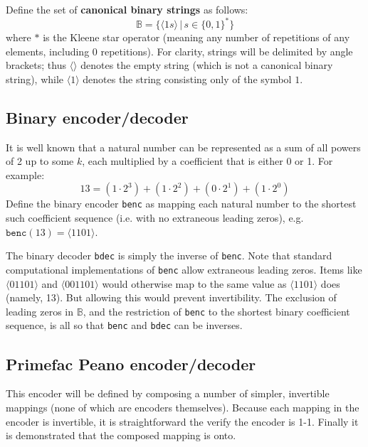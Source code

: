 \documentclass[12pt,reqno]{article}
\begin{document}
Define the set of \textbf{canonical binary strings} as follows:
\begin{equation}
  \mathbb{B} = \{ \langle 1s \rangle \, | \, s \in \{0,1\}^{*} \}
\end{equation}
where $*$ is the Kleene star operator (meaning any number of repetitions of any elements, including 0 repetitions). For clarity, strings will be delimited by angle brackets; thus $\langle \rangle$ denotes the empty string (which is not a canonical binary string), while $\langle 1 \rangle$ denotes the string consisting only of the symbol $1$.

\subsection{Binary encoder/decoder}

It is well known that a natural number can be represented as a sum of all powers of 2 up to some $k$, each multiplied by a coefficient that is either 0 or 1. For example:
\begin{equation}
  13 = (1 \cdot 2^3) + (1 \cdot 2^2) + (0 \cdot 2^1) + (1 \cdot 2^0)
\end{equation}
Define the binary encoder \texttt{benc} as mapping each natural number to the shortest such coefficient sequence (i.e. with no extraneous leading zeros), e.g. $\texttt{benc}(13) = \langle 1101 \rangle$.

The binary decoder \texttt{bdec} is simply the inverse of \texttt{benc}. Note that standard computational implementations of \texttt{benc} allow extraneous leading zeros. Items like $\langle 01101 \rangle$ and $\langle 001101 \rangle$ would otherwise map to the same value as $\langle 1101 \rangle$ does (namely, 13). But allowing this would prevent invertibility. The exclusion of leading zeros in $\mathbb{B}$, and the restriction of \texttt{benc} to the shortest binary coefficient sequence, is all so that \texttt{benc} and \texttt{bdec} can be inverses.

\subsection{Primefac Peano encoder/decoder}

This encoder will be defined by composing a number of simpler, invertible mappings (none of which are encoders themselves). Because each mapping in the encoder is invertible, it is straightforward the verify the encoder is 1-1. Finally it is demonstrated that the composed mapping is onto.
\end{document}

